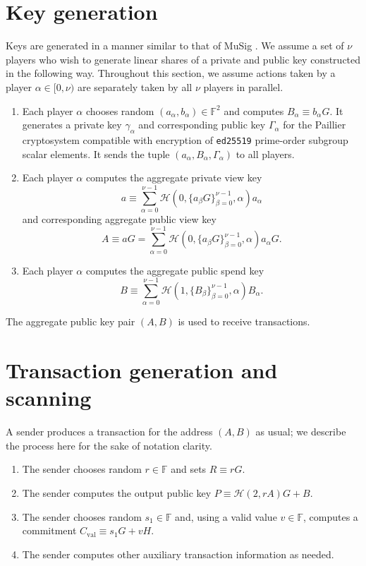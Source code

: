 \documentclass{article}
\newcommand{\F}{\mathbb{F}}
\newcommand{\hs}{\mathcal{H}}
\begin{document}
\section{Key generation}

Keys are generated in a manner similar to that of MuSig \cite{musig}.
We assume a set of $\nu$ players who wish to generate linear shares of a private and public key constructed in the following way.
Throughout this section, we assume actions taken by a player $\alpha \in [0,\nu)$ are separately taken by all $\nu$ players in parallel.
\begin{enumerate}
    \item Each player $\alpha$ chooses random $(a_\alpha, b_\alpha) \in \F^2$ and computes $B_\alpha \equiv b_\alpha G$.
    It generates a private key $\gamma_\alpha$ and corresponding public key $\Gamma_\alpha$ for the Paillier cryptosystem compatible with encryption of \texttt{ed25519} prime-order subgroup scalar elements.
    It sends the tuple $(a_\alpha, B_\alpha, \Gamma_\alpha)$ to all players.
    \item Each player $\alpha$ computes the aggregate private view key $$a \equiv \sum_{\alpha=0}^{\nu-1} \hs(0, \{a_\beta G\}_{\beta=0}^{\nu-1}, \alpha) a_\alpha$$ and corresponding aggregate public view key $$A \equiv aG = \sum_{\alpha=0}^{\nu-1} \hs(0, \{a_\beta G\}_{\beta=0}^{\nu-1}, \alpha) a_\alpha G.$$
    \item Each player $\alpha$ computes the aggregate public spend key $$B \equiv \sum_{\alpha=0}^{\nu-1} \hs(1, \{B_\beta\}_{\beta=0}^{\nu-1}, \alpha) B_\alpha.$$
\end{enumerate}

The aggregate public key pair $(A,B)$ is used to receive transactions.


\section{Transaction generation and scanning}

A sender produces a transaction for the address $(A,B)$ as usual; we describe the process here for the sake of notation clarity.
\begin{enumerate}
    \item The sender chooses random $r \in \F$ and sets $R \equiv rG$.
    \item The sender computes the output public key $P \equiv \hs(2,rA)G + B$.
    \item The sender chooses random $s_1 \in \F$ and, using a valid value $v \in \F$, computes a commitment $C_{\operatorname{val}} \equiv s_1 G + vH$.
    \item The sender computes other auxiliary transaction information as needed.
\end{enumerate}
\end{document}
